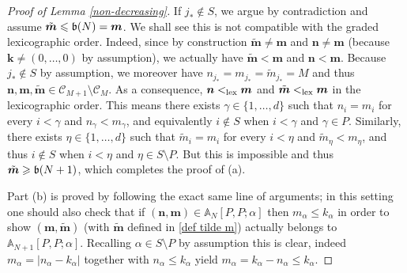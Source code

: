 \documentclass[a4paper,11pt]{article}
\numberwithin{equation}{section}
\theoremstyle{definition}
\newcommand{\bs}{\boldsymbol}
\renewcommand{\leq}{\leqslant}
\renewcommand{\geq}{\geqslant}
\begin{document}
\begin{proof}[Proof of Lemma \ref{non-decreasing}]
If  ${j_*}\notin S$, we argue by contradiction and assume   $\tilde {\bs m}\leq \frak b(N)=\bs m$. We shall see this is not compatible with the graded lexicographic order. Indeed, since by construction $\tilde {\bs m}\neq \bs m$ and $\bs n\neq \bs m$  (because $\bs k\neq (0,\ldots,0)$ by assumption), we actually have $\tilde {\bs m}< \bs m$ and  $\bs n< \bs m$.  Because ${j_*}\notin S$ by assumption, we moreover have  $n_{j_*}=m_{j_*}=\tilde m_{j_*}=M$ and thus $\bs n,\bs m,  \tilde {\bs m}\in \mathcal C_{M+1}\setminus\mathcal C_M$. As a consequence, $ {\bs n}<_{{\rm lex}}\bs m$ and $\tilde {\bs m}<_{{\rm lex}}\bs m$ in the  lexicographic order. This means there exists $\gamma\in\{1,\ldots,d\}$ such that $n_i=m_i$ for every $i<\gamma$ and $n_\gamma<m_\gamma$, and equivalently $i\notin S$ when $i<\gamma$ and $\gamma\in P$. Similarly, there exists $\eta\in\{1,\ldots,d\}$ such that $\tilde m_i=m_i$ for every $i<\eta$ and $\tilde m_\eta<m_\eta$, and thus $i\notin S$ when $i<\eta$ and $\eta\in S\setminus P$. But this is impossible and thus  $\tilde {\bs m}\geq \frak b(N+1)$, which completes the proof of (a).

Part (b) is proved by following the exact same line of arguments; in this setting one should also check that if  $(\bs n,\bs m)\in\mathbb A_{N}[P,P;\alpha]$ then $m_\alpha\leq k_\alpha$  in order to show $(\bs m ,\tilde {\bs m})$ (with $\tilde{\bs m}$ defined in \eqref{def tilde m})  actually belongs to $\mathbb A_{N+1}[P,P;\alpha]$. Recalling  $\alpha\in S\setminus P$ by assumption this is clear, indeed $m_\alpha=|n_\alpha-k_\alpha|$ together with $n_\alpha\leq k_\alpha$ yield $m_\alpha=k_\alpha-n_\alpha\leq k_\alpha$.
\end{proof}
\end{document}
